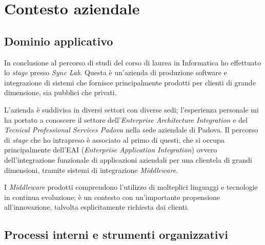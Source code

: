 \chapter{Contesto aziendale}

\section{Dominio applicativo}
In conclusione al percorso di studi del corso di laurea in Informatica ho effettuato lo \textit{stage} presso \textit{Sync Lab}.
Questa è un'azienda di produzione software e integrazione di sistemi che fornisce principalmente prodotti per clienti di grande dimensione, sia pubblici che privati.

L'azienda è suddivisa in diversi settori con diverse sedi; l'esperienza personale mi ha portato a conoscere il settore dell'\textit{Enterprise Architecture Integration} e del \textit{Tecnical Professional Services Padova} nella sede aziendale di Padova.
Il percorso di \textit{stage} che ho intrapreso è associato al primo di questi, che si occupa principalmente dell'EAI (\textit{Enterprise Application Integration}) ovvero dell'integrazione funzionale di applicazioni aziendali per una clientela di grandi dimensioni, tramite sistemi di integrazione \textit{Middleware}.

I \textit{Middleware} prodotti comprendono l'utilizzo di molteplici linguaggi e tecnologie in continua evoluzione; è un contesto con un'importante propensione all'innovazione, talvolta esplicitamente richiesta dai clienti.

\section{Processi interni e strumenti organizzativi}

%

